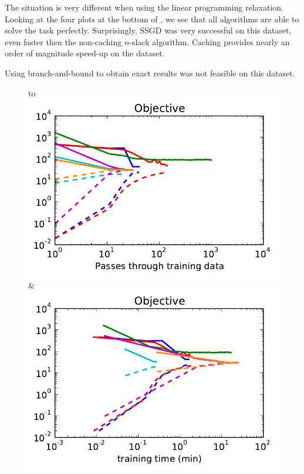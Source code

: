 The situation is very different when using the linear programming relaxation.
Looking at the four plots at the bottom of , we see that all
algorithms are able to solve the task perfectly. %
Surprisingly, SSGD was very successful on this dataset, even faster then the non-caching $n$-slack
algorithm. Caching provides nearly an order of magnitude speed-up on the dataset.

Using branch-and-bound to obtain exact results was not feasible on this dataset.

\begin{figure}
    \begin{tabu} to 
    \\[-3mm]
    \includegraphics[width=\linewidth]{evaluation/images/snakes_qpbo}&%
    \includegraphics[width=\linewidth]{evaluation/images/snakes_qpbo_time}\\

\end{tabu}
\end{figure}
